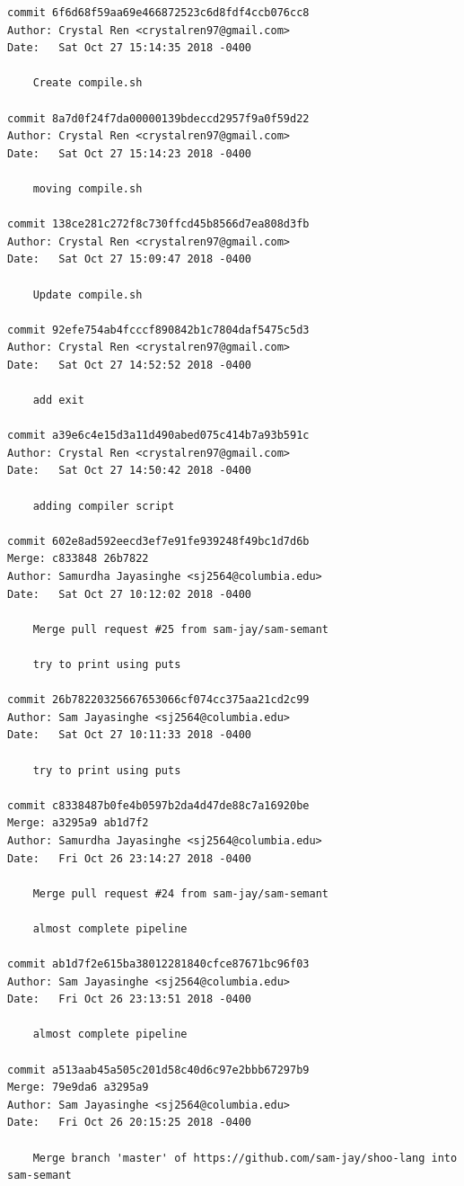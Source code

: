 \documentclass[12pt]{article}
\begin{document}
\begin{lstlisting}
commit 6f6d68f59aa69e466872523c6d8fdf4ccb076cc8
Author: Crystal Ren <crystalren97@gmail.com>
Date:   Sat Oct 27 15:14:35 2018 -0400

    Create compile.sh

commit 8a7d0f24f7da00000139bdeccd2957f9a0f59d22
Author: Crystal Ren <crystalren97@gmail.com>
Date:   Sat Oct 27 15:14:23 2018 -0400

    moving compile.sh

commit 138ce281c272f8c730ffcd45b8566d7ea808d3fb
Author: Crystal Ren <crystalren97@gmail.com>
Date:   Sat Oct 27 15:09:47 2018 -0400

    Update compile.sh

commit 92efe754ab4fcccf890842b1c7804daf5475c5d3
Author: Crystal Ren <crystalren97@gmail.com>
Date:   Sat Oct 27 14:52:52 2018 -0400

    add exit

commit a39e6c4e15d3a11d490abed075c414b7a93b591c
Author: Crystal Ren <crystalren97@gmail.com>
Date:   Sat Oct 27 14:50:42 2018 -0400

    adding compiler script

commit 602e8ad592eecd3ef7e91fe939248f49bc1d7d6b
Merge: c833848 26b7822
Author: Samurdha Jayasinghe <sj2564@columbia.edu>
Date:   Sat Oct 27 10:12:02 2018 -0400

    Merge pull request #25 from sam-jay/sam-semant
    
    try to print using puts

commit 26b78220325667653066cf074cc375aa21cd2c99
Author: Sam Jayasinghe <sj2564@columbia.edu>
Date:   Sat Oct 27 10:11:33 2018 -0400

    try to print using puts

commit c8338487b0fe4b0597b2da4d47de88c7a16920be
Merge: a3295a9 ab1d7f2
Author: Samurdha Jayasinghe <sj2564@columbia.edu>
Date:   Fri Oct 26 23:14:27 2018 -0400

    Merge pull request #24 from sam-jay/sam-semant
    
    almost complete pipeline

commit ab1d7f2e615ba38012281840cfce87671bc96f03
Author: Sam Jayasinghe <sj2564@columbia.edu>
Date:   Fri Oct 26 23:13:51 2018 -0400

    almost complete pipeline

commit a513aab45a505c201d58c40d6c97e2bbb67297b9
Merge: 79e9da6 a3295a9
Author: Sam Jayasinghe <sj2564@columbia.edu>
Date:   Fri Oct 26 20:15:25 2018 -0400

    Merge branch 'master' of https://github.com/sam-jay/shoo-lang into sam-semant


\end{lstlisting}
\end{document}
